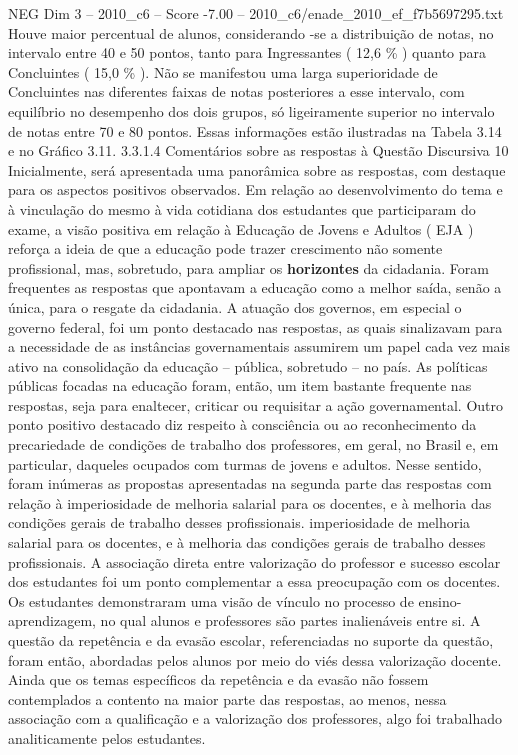 \begin{textsample}{NEG Dim 3 – 2010\_c6 – Score -7.00 – 2010\_c6/enade\_2010\_ef\_f7b5697295.txt}
Houve maior percentual de alunos, considerando -se a distribuição de notas, no intervalo entre 40 e 50 pontos, tanto para Ingressantes ( 12,6 \% ) quanto para Concluintes ( 15,0 \% ).
Não se manifestou uma larga superioridade de Concluintes nas diferentes faixas de notas posteriores a esse intervalo, com equilíbrio no desempenho dos dois grupos, só ligeiramente superior no intervalo de notas entre 70 e 80 pontos.
Essas informações estão ilustradas na Tabela 3.14 e no Gráfico 3.11. 3.3.1.4 Comentários sobre as respostas à Questão Discursiva 10 Inicialmente, será apresentada uma panorâmica sobre as respostas, com destaque para os aspectos positivos observados.
Em relação ao desenvolvimento do tema e à vinculação do mesmo à vida cotidiana dos estudantes que participaram do exame, a visão positiva em relação à Educação de Jovens e Adultos ( EJA ) reforça a ideia de que a educação pode trazer crescimento não somente profissional, mas, sobretudo, para ampliar os \textbf{horizontes} da cidadania.
Foram frequentes as respostas que apontavam a educação como a melhor saída, senão a única, para o resgate da cidadania.
A atuação dos governos, em especial o governo federal, foi um ponto destacado nas respostas, as quais sinalizavam para a necessidade de as instâncias governamentais assumirem um papel cada vez mais ativo na consolidação da educação – pública, sobretudo – no país.
As políticas públicas focadas na educação foram, então, um item bastante frequente nas respostas, seja para enaltecer, criticar ou requisitar a ação governamental.
Outro ponto positivo destacado diz respeito à consciência ou ao reconhecimento da precariedade de condições de trabalho dos professores, em geral, no Brasil e, em particular, daqueles ocupados com turmas de jovens e adultos.
Nesse sentido, foram inúmeras as propostas apresentadas na segunda parte das respostas com relação à imperiosidade de melhoria salarial para os docentes, e à melhoria das condições gerais de trabalho desses profissionais. imperiosidade de melhoria salarial para os docentes, e à melhoria das condições gerais de trabalho desses profissionais.
A associação direta entre valorização do professor e sucesso escolar dos estudantes foi um ponto complementar a essa preocupação com os docentes.
Os estudantes demonstraram uma visão de vínculo no processo de ensino-aprendizagem, no qual alunos e professores são partes inalienáveis entre si.
A questão da repetência e da evasão escolar, referenciadas no suporte da questão, foram então, abordadas pelos alunos por meio do viés dessa valorização docente.
Ainda que os temas específicos da repetência e da evasão não fossem contemplados a contento na maior parte das respostas, ao menos, nessa associação com a qualificação e a valorização dos professores, algo foi trabalhado analiticamente pelos estudantes.

\end{textsample}
